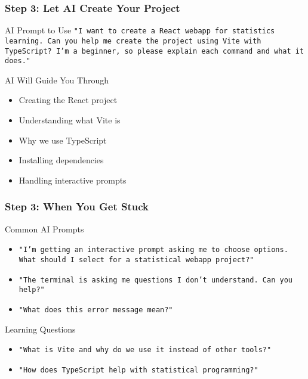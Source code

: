 \documentclass[aspectratio=169]{beamer}
\begin{document}
\begin{frame}
\frametitle{Step 3: Let AI Create Your Project}
\begin{alertblock}{AI Prompt to Use}
\texttt{"I want to create a React webapp for statistics learning. Can you help me create the project using Vite with TypeScript? I'm a beginner, so please explain each command and what it does."}
\end{alertblock}

\begin{exampleblock}{AI Will Guide You Through}
\begin{itemize}
\item Creating the React project
\item Understanding what Vite is
\item Why we use TypeScript
\item Installing dependencies
\item Handling interactive prompts
\end{itemize}
\end{exampleblock}
\end{frame}

\begin{frame}
\frametitle{Step 3: When You Get Stuck}
\begin{alertblock}{Common AI Prompts}
\begin{itemize}
\item \texttt{"I'm getting an interactive prompt asking me to choose options. What should I select for a statistical webapp project?"}
\item \texttt{"The terminal is asking me questions I don't understand. Can you help?"}
\item \texttt{"What does this error message mean?"}
\end{itemize}
\end{alertblock}

\begin{exampleblock}{Learning Questions}
\begin{itemize}
\item \texttt{"What is Vite and why do we use it instead of other tools?"}
\item \texttt{"How does TypeScript help with statistical programming?"}
\end{itemize}
\end{exampleblock}
\end{frame}
\end{document}
